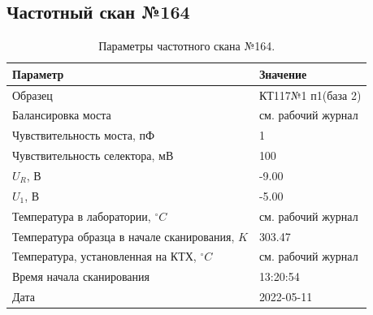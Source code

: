\subsection{Частотный скан №164}
\begin{table}[!ht]
    \centering
    \caption{Параметры частотного скана №164.}
    \begin{tabular}{|l|l|}
        \hline
        Параметр                                       & Значение                  \\ \hline
        Образец                                        & КТ117№1 п1(база 2)        \\ \hline
        Балансировка моста                             & см. рабочий журнал        \\ \hline
        Чувствительность моста, пФ                     & 1                         \\ \hline
        Чувствительность селектора, мВ                 & 100                       \\ \hline
        $U_R$, В                                       & -9.00                     \\ \hline
        $U_1$, В                                       & -5.00                     \\ \hline
        Температура в лаборатории, $^\circ C$          & см. рабочий журнал        \\ \hline
        Температура образца в начале сканирования, $K$ & 303.47                    \\ \hline
        Температура, установленная на КТХ, $^\circ C$  & см. рабочий журнал        \\ \hline
        Время начала сканирования                      & 13:20:54                  \\ \hline
        Дата                                           & 2022-05-11                \\ \hline
    \end{tabular}
    \label{table:frequency_scan_164}
\end{table}

